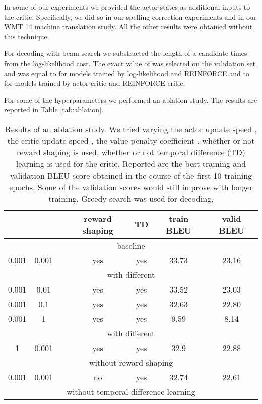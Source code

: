 \documentclass{article} \usepackage{iclr2017_conference,times}
\begin{document}
In some of our experiments we provided the actor states as additional inputs to
the critic.  Specifically, we did so in our spelling correction experiments and
in our WMT 14 machine translation study. All the other results were obtained
without this technique.

For decoding with beam search we substracted the length of a candidate
times  from the log-likelihood cost. The exact value of  
was selected on the validation set and was equal to 
for models trained by log-likelihood and REINFORCE and to 
for models trained by actor-critic and REINFORCE-critic.

For some of the hyperparameters we performed an ablation study. The results are reported in Table \ref{tab:ablation}.

\begin{table}
    \caption{Results of an ablation study. We tried varying the actor update speed , 
             the critic update speed , the value penalty coefficient , 
             whether or not reward shaping is used, whether or not temporal difference (TD) learning is used
             for the critic. Reported are the best training and validation BLEU score obtained in the course
             of the first 10 training epochs. Some of the validation scores would still improve with longer training.
             Greedy search was used for decoding.}
    \centering
    \begin{tabular}{c  c  c  c  c  c c}
         &  &  & reward shaping & TD & train BLEU & valid BLEU \\
        \hline
        \multicolumn{7}{c}{baseline} \\
0.001 & 0.001 &  & yes & yes & 33.73 & 23.16 \\
        \hline
        \multicolumn{7}{c}{with different } \\
0.001 & 0.01 &  & yes & yes & 33.52 & 23.03 \\
0.001 & 0.1 &  & yes & yes & 32.63 & 22.80 \\
0.001 & 1 &  & yes & yes & 9.59 & 8.14 \\
        \hline
        \multicolumn{7}{c}{with different } \\
1 & 0.001 &  & yes & yes & 32.9 & 22.88 \\
        \hline
        \multicolumn{7}{c}{without reward shaping} \\
0.001 & 0.001 &  & no & yes & 32.74 & 22.61 \\
        \hline
        \multicolumn{7}{c}{without temporal difference learning} \\

\end{tabular}
\end{table}
\end{document}
